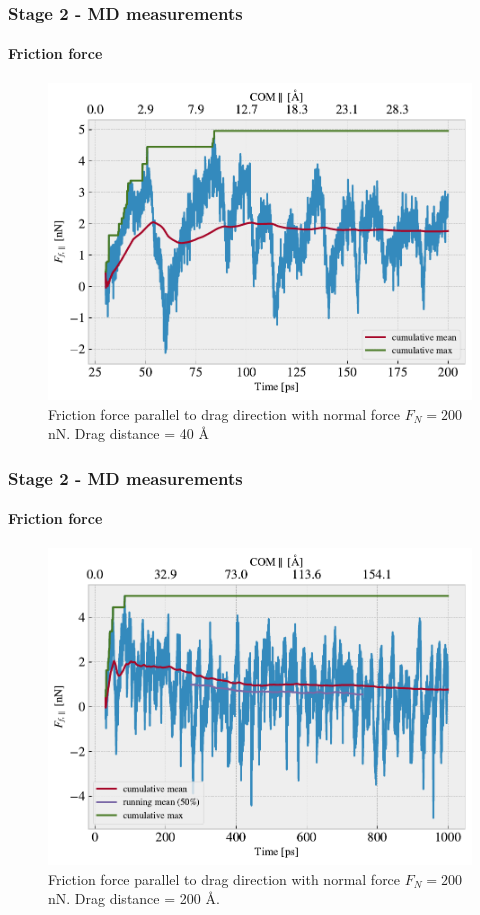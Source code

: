 \documentclass[
	10pt, %
]{beamer}
\begin{document}

\begin{frame}
	\frametitle{Stage 2 - MD measurements}
	\framesubtitle{Friction force}

	
	\begin{figure}
		\includegraphics[width=0.7\linewidth]{figures/drag1.pdf}
		\caption{Friction force parallel to drag direction with normal force $F_N = 200$ nN. Drag distance = 40 Å}
	\end{figure}	
	
\end{frame}

\begin{frame}
	\frametitle{Stage 2 - MD measurements}
	\framesubtitle{Friction force}

	
	\begin{figure}
		\includegraphics[width=0.7\linewidth]{figures/drag2.pdf}
		\caption{Friction force parallel to drag direction with normal force $F_N = 200$ nN. Drag distance = 200 Å.}
	\end{figure}	
	
\end{frame}
\end{document}
